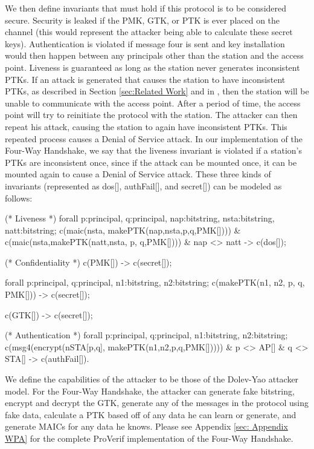 \documentclass[11pt, twocolumn]{article} %
\begin{document}
{We then define invariants that must hold if this protocol is to be considered secure.  Security is leaked if the PMK, GTK, or PTK is ever placed on the channel (this would represent the attacker being able to calculate these secret keys).  Authentication is violated if message four is sent and key installation would then happen between any principals other than the station and the access point.  Liveness is guaranteed as long as the station never generates inconsistent PTKs.  If an attack is generated that causes the station to have inconsistent PTKs, as described in Section \ref{sec:Related Work} and in \cite{he04}, then the station will be unable to communicate with the access point.  After a period of time, the access point will try to reinitiate the protocol with the station.  The attacker can then repeat his attack, causing the station to again have inconsistent PTKs.  This repeated process causes a Denial of Service attack.  In our implementation of the Four-Way Handshake, we say that the liveness invariant is violated if a station's PTKs are inconsistent once, since if the attack can be mounted once, it can be mounted again to cause a Denial of Service attack.  These three kinds of invariants (represented as dos[], authFail[], and secret[]) can be modeled as follows:

\begin{verbatimtab}[3]
(* Liveness *)
forall p:principal, q:principal, 
	nap:bitstring, nsta:bitstring, 
		natt:bitstring; c(maic(nsta,
			makePTK(nap,nsta,p,q,PMK[]))) & 
				c(maic(nsta,makePTK(natt,nsta,
					p, q,PMK[]))) & 
						nap <> natt -> c(dos[]); 

(* Confidentiality *)
c(PMK[]) -> c(secret[]);

forall p:principal, q:principal, 
	n1:bitstring, n2:bitstring; 
		c(makePTK(n1, n2, p, q, PMK[])) 
			-> c(secret[]); 

c(GTK[]) -> c(secret[]);

(* Authentication *)
forall p:principal, q:principal, 
	n1:bitstring, n2:bitstring; 
		c(msg4(encrypt(nSTA[p,q],
			makePTK(n1,n2,p,q,PMK[])))) 
				& p <> AP[] & 
					q <> STA[] -> c(authFail[]).
\end{verbatimtab}

We define the capabilities of the attacker to be those of the Dolev-Yao attacker model.  For the Four-Way Handshake, the attacker can generate fake bitstring, encrypt and decrypt the GTK, generate any of the messages in the protocol using fake data, calculate a PTK based off of any data he can learn or generate, and generate MAICs for any data he knows.  Please see Appendix \ref{sec: Appendix WPA} for the complete ProVerif implementation of the Four-Way Handshake.

}
\end{document}
